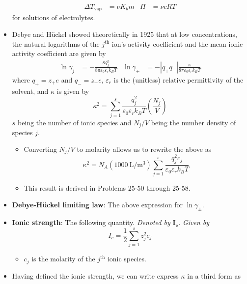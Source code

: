 \documentclass[../notes.tex]{subfiles}
\begin{document}
\begin{itemize}
\begin{align*}
        \Delta T_\text{vap} &= \nu K_bm&
        \Pi &= \nu cRT
    \end{align*}
    for solutions of electrolytes.
    \item Debye and H\"{u}ckel showed theoretically in 1925 that at low concentrations, the natural logarithms of the $j^\text{th}$ ion's activity coefficient and the mean ionic activity coefficient are given by
    \begin{align*}
        \ln\gamma_j &= -\frac{\kappa q_j^2}{8\pi\varepsilon_0\varepsilon_rk_BT}&
        \ln\gamma_\pm &= -|q_+q_-|\frac{\kappa}{8\pi\varepsilon_0\varepsilon_rk_BT}
    \end{align*}
    where $q_+=z_+e$ and $q_-=z_-e$, $\varepsilon_r$ is the (unitless) relative permittivity of the solvent, and $\kappa$ is given by
    \begin{equation*}
        \kappa^2 = \sum_{j=1}^s\frac{q_j^2}{\varepsilon_0\varepsilon_rk_BT}\left( \frac{N_j}{V} \right)
    \end{equation*}
    $s$ being the number of ionic species and $N_j/V$ being the number density of species $j$.
    \begin{itemize}
        \item Converting $N_j/V$ to molarity allows us to rewrite the above as
        \begin{equation*}
            \kappa^2 = N_A(\SI{1000}{\liter\per\cubic\meter})\sum_{j=1}^s\frac{q_j^2c_j}{\varepsilon_0\varepsilon_rk_BT}
        \end{equation*}
        \item This result is derived in Problems 25-50 through 25-58.
    \end{itemize}
    \item \textbf{Debye-H\"{u}ckel limiting law}: The above expression for $\ln\gamma_\pm$.
    \item \textbf{Ionic strength}: The following quantity. \emph{Denoted by} $\bm{I_c}$. \emph{Given by}
    \begin{equation*}
        I_c = \frac{1}{2}\sum_{j=1}^sz_j^2c_j
    \end{equation*}
    \begin{itemize}
        \item $c_j$ is the molarity of the $j^\text{th}$ ionic species.
    \end{itemize}
    \item Having defined the ionic strength, we can write express $\kappa$ in a third form as
    \begin{equation*}

\end{equation*}
\end{itemize}
\end{document}
